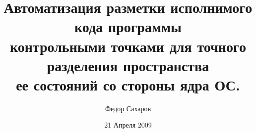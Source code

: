 \begin{titlepage}
	\author{Федор Сахаров}
	\title{Автоматизация разметки исполнимого кода программы\\ 
	контрольными точками для точного разделения пространства\\ 
	ее состояний со стороны ядра ОС.}
	\date{21 Апреля 2009}
	\maketitle
	
\end{titlepage}

